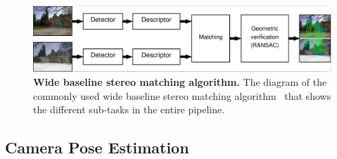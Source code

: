 
\begin{figure}
    \begin{center}
        \includegraphics[width=\linewidth]{main/chapter03/data/wbs/wbs_scheme.jpg} 
    \end{center}
    \caption[Wide baseline stereo matching algorithm]{\textbf{Wide baseline stereo matching algorithm.} The diagram of the commonly used wide baseline stereo matching algorithm~\citep{Pritchett1998} that shows the different sub-tasks in the entire pipeline.}
    \label{fig:wbs-pipeline}
\end{figure}

\subsection{Camera Pose Estimation}


